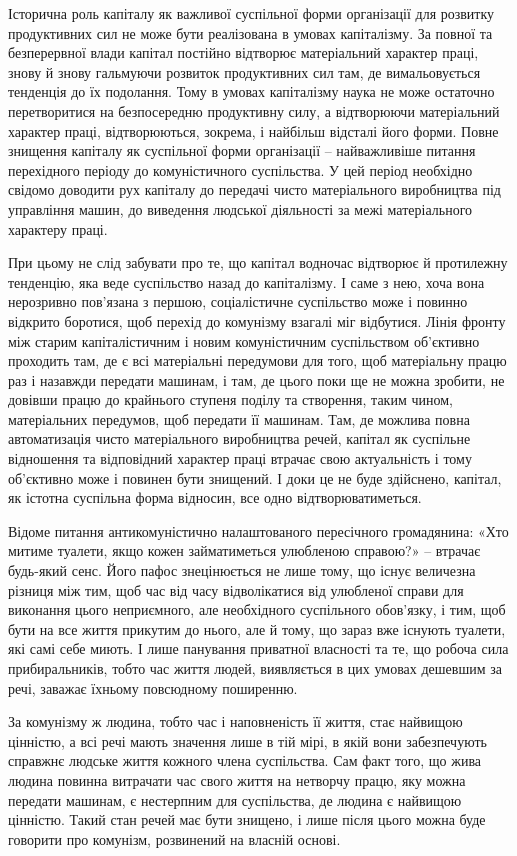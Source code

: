 \documentclass[../main]{subfiles}
\begin{document}
Історична роль капіталу як важливої суспільної форми організації для розвитку продуктивних сил не може бути реалізована в умовах капіталізму. За повної та безперервної влади капітал постійно відтворює матеріальний характер праці, знову й знову гальмуючи розвиток продуктивних сил там, де вимальовується тенденція до їх подолання. Тому в умовах капіталізму наука не може остаточно перетворитися на безпосередню продуктивну силу, а відтворюючи матеріальний характер праці, відтворюються, зокрема, і найбільш відсталі його форми. Повне знищення капіталу як суспільної форми організації – найважливіше питання перехідного періоду до комуністичного суспільства. У цей період необхідно свідомо доводити рух капіталу до передачі чисто матеріального виробництва під управління машин, до виведення людської діяльності за межі матеріального характеру праці.

При цьому не слід забувати про те, що капітал водночас відтворює й протилежну тенденцію, яка веде суспільство назад до капіталізму. І саме з нею, хоча вона нерозривно пов’язана з першою, соціалістичне суспільство може і повинно відкрито боротися, щоб перехід до комунізму взагалі міг відбутися. Лінія фронту між старим капіталістичним і новим комуністичним суспільством об’єктивно проходить там, де є всі матеріальні передумови для того, щоб матеріальну працю раз і назавжди передати машинам, і там, де цього поки ще не можна зробити, не довівши працю до крайнього ступеня поділу та створення, таким чином, матеріальних передумов, щоб передати її машинам. Там, де можлива повна автоматизація чисто матеріального виробництва речей, капітал як суспільне відношення та відповідний характер праці втрачає свою актуальність і тому об’єктивно може і повинен бути знищений. І доки це не буде здійснено, капітал, як істотна суспільна форма відносин, все одно відтворюватиметься.

Відоме питання антикомуністично налаштованого пересічного громадянина: «Хто митиме туалети, якщо кожен займатиметься улюбленою справою?» – втрачає будь-який сенс. Його пафос знецінюється не лише тому, що існує величезна різниця між тим, щоб час від часу відволікатися від улюбленої справи для виконання цього неприємного, але необхідного суспільного обов’язку, і тим, щоб бути на все життя прикутим до нього, але й тому, що зараз вже існують туалети, які самі себе миють. І лише панування приватної власності та те, що робоча сила прибиральників, тобто час життя людей, виявляється в цих умовах дешевшим за речі, заважає їхньому повсюдному поширенню.

За комунізму ж людина, тобто час і наповненість її життя, стає найвищою цінністю, а всі речі мають значення лише в тій мірі, в якій вони забезпечують справжнє людське життя кожного члена суспільства. Сам факт того, що жива людина повинна витрачати час свого життя на нетворчу працю, яку можна передати машинам, є нестерпним для суспільства, де людина є найвищою цінністю. Такий стан речей має бути знищено, і лише після цього можна буде говорити про комунізм, розвинений на власній основі.
\end{document}
